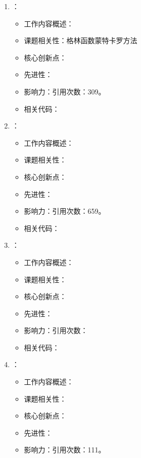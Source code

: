 \begin{enumerate}
\begin{itemize}
            \end{itemize}
        \item \citet{trivedi1990ground}：
            \begin{itemize}
                \item 工作内容概述：
                \item 课题相关性：格林函数蒙特卡罗方法
                \item 核心创新点：
                \item 先进性：
                \item 影响力：引用次数：309。
                \item 相关代码：
            \end{itemize}
        \item \citet{umrigar1993diffusion}：
            \begin{itemize}
                \item 工作内容概述：
                \item 课题相关性：
                \item 核心创新点：
                \item 先进性：
                \item 影响力：引用次数：659。
                \item 相关代码：
            \end{itemize}
        \item \citet{finnila1994quantum}：
            \begin{itemize}
                \item 工作内容概述：
                \item 课题相关性：
                \item 核心创新点：
                \item 先进性：
                \item 影响力：引用次数：
                \item 相关代码：
            \end{itemize}
            \item \citet{sorella2000green}：
            \begin{itemize}
                \item 工作内容概述：
                \item 课题相关性：
                \item 核心创新点：
                \item 先进性：
                \item 影响力：引用次数：111。

\end{itemize}
\end{enumerate}
